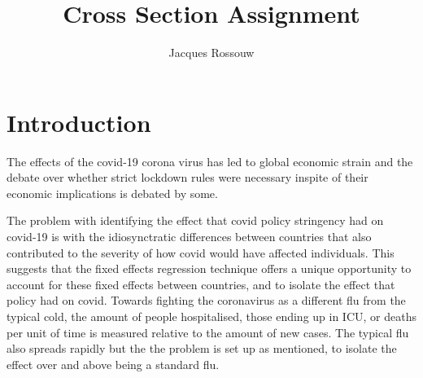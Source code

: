 \documentclass[11pt,preprint, authoryear]{elsarticle}
\numberwithin{equation}{section}
\numberwithin{figure}{section}
\numberwithin{table}{section}
\begin{document}
\begin{frontmatter}  %

\title{Cross Section Assignment}





\author[Add1]{Jacques Rossouw}





\address[Add1]{Stellebosch, Western Cape, South Africa}



\vspace{1cm}





\vspace{0.5cm}

\end{frontmatter}


\newpage
\renewcommand{\contentsname}{Table of Contents}
{\tableofcontents}

\pagestyle{fancy}
\chead{}
\rhead{}
\lfoot{}
\lhead{}
\cfoot{}


\headsep 35pt %




\newpage

\hypertarget{introduction}{%
\section{Introduction}\label{introduction}}

The effects of the covid-19 corona virus has led to global economic
strain and the debate over whether strict lockdown rules were necessary
inspite of their economic implications is debated by some.

The problem with identifying the effect that covid policy stringency had
on covid-19 is with the idiosynctratic differences between countries
that also contributed to the severity of how covid would have affected
individuals. This suggests that the fixed effects regression technique
offers a unique opportunity to account for these fixed effects between
countries, and to isolate the effect that policy had on covid. Towards
fighting the coronavirus as a different flu from the typical cold, the
amount of people hospitalised, those ending up in ICU, or deaths per
unit of time is measured relative to the amount of new cases. The
typical flu also spreads rapidly but the the problem is set up as
mentioned, to isolate the effect over and above being a standard flu.
\end{document}
